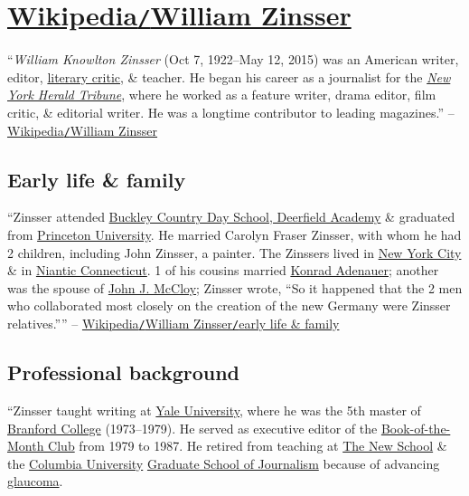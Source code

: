 \documentclass[oneside]{book}
\numberwithin{equation}{section}
\begin{document}

\section{\href{https://en.wikipedia.org/wiki/William_Zinsser}{Wikipedia\texttt{/}William Zinsser}}
``\textit{William Knowlton Zinsser} (Oct 7, 1922--May 12, 2015) was an American writer, editor, \href{https://en.wikipedia.org/wiki/Literary_critic}{literary critic}, \& teacher. He began his career as a journalist for the \href{https://en.wikipedia.org/wiki/New_York_Herald_Tribune}{\textit{New York Herald Tribune}}, where he worked as a feature writer, drama editor, film critic, \& editorial writer. He was a longtime contributor to leading magazines.'' -- \href{https://en.wikipedia.org/wiki/William_Zinsser}{Wikipedia\texttt{/}William Zinsser}

\subsection{Early life \& family}
``Zinsser attended \href{https://en.wikipedia.org/wiki/Buckley_Country_Day_School}{Buckley Country Day School, Deerfield Academy} \& graduated from \href{https://en.wikipedia.org/wiki/Princeton_University}{Princeton University}. He married Carolyn Fraser Zinsser, with whom he had 2 children, including John Zinsser, a painter. The Zinssers lived in \href{https://en.wikipedia.org/wiki/New_York_City}{New York City} \& in \href{https://en.wikipedia.org/wiki/Niantic,_Connecticut}{Niantic Connecticut}. 1 of his cousins married \href{https://en.wikipedia.org/wiki/Konrad_Adenauer}{Konrad Adenauer}; another was the spouse of \href{https://en.wikipedia.org/wiki/John_J._McCloy}{John J. McCloy}; Zinsser wrote, ``So it happened that the 2 men who collaborated most closely on the creation of the new Germany were Zinsser relatives.'''' -- \href{https://en.wikipedia.org/wiki/William_Zinsser#Early_life_and_family}{Wikipedia\texttt{/}William Zinsser\texttt{/}early life \& family}

\subsection{Professional background}
``Zinsser taught writing at \href{https://en.wikipedia.org/wiki/Yale_University}{Yale University}, where he was the 5th master of \href{https://en.wikipedia.org/wiki/Branford_College}{Branford College} (1973--1979). He served as executive editor of the \href{https://en.wikipedia.org/wiki/Book-of-the-Month_Club}{Book-of-the-Month Club} from 1979 to 1987. He retired from teaching at \href{https://en.wikipedia.org/wiki/The_New_School}{The New School} \& the \href{https://en.wikipedia.org/wiki/Columbia_University}{Columbia University} \href{https://en.wikipedia.org/wiki/Columbia_University_Graduate_School_of_Journalism}{Graduate School of Journalism} because of advancing \href{https://en.wikipedia.org/wiki/Glaucoma}{glaucoma}.
\end{document}
